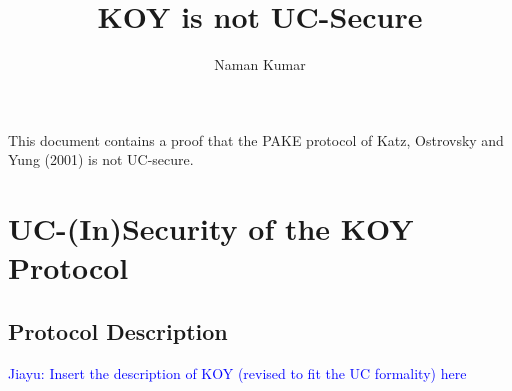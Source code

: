 \documentclass[12pt,a4paper]{article}
\title{\textbf{KOY is not UC-Secure}}
\author{Naman Kumar}
\def\xjy#1{\textcolor{blue}{Jiayu: #1}}
\begin{document}
	\maketitle
	
	This document contains a proof that the PAKE protocol of Katz, Ostrovsky and Yung (2001) is not UC-secure.

\section{UC-(In)Security of the KOY Protocol}
\subsection{Protocol Description}
\xjy{Insert the description of KOY (revised to fit the UC formality) here}
\end{document}
